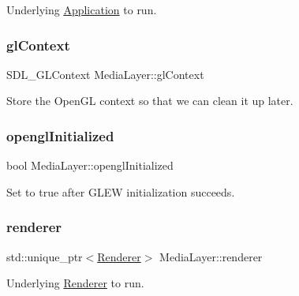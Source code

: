 Underlying \hyperlink{class_application}{Application} to run. 

\hypertarget{class_media_layer_a0e027d967e7c796efaed751e0b0a7090}{}\label{class_media_layer_a0e027d967e7c796efaed751e0b0a7090} 
\subsubsection{\texorpdfstring{gl\+Context}{glContext}}
{\footnotesize\ttfamily S\+D\+L\+\_\+\+G\+L\+Context Media\+Layer\+::gl\+Context\hspace{0.3cm}{\ttfamily [private]}}



Store the Open\+GL context so that we can clean it up later. 

\hypertarget{class_media_layer_abb67004f8dd82afd036233dfb225df3d}{}\label{class_media_layer_abb67004f8dd82afd036233dfb225df3d} 
\subsubsection{\texorpdfstring{opengl\+Initialized}{openglInitialized}}
{\footnotesize\ttfamily bool Media\+Layer\+::opengl\+Initialized\hspace{0.3cm}{\ttfamily [private]}}



Set to true after G\+L\+EW initialization succeeds. 

\hypertarget{class_media_layer_aee28804a7f4e1fb771b11e93b218e387}{}\label{class_media_layer_aee28804a7f4e1fb771b11e93b218e387} 
\subsubsection{\texorpdfstring{renderer}{renderer}}
{\footnotesize\ttfamily std\+::unique\+\_\+ptr$<$\hyperlink{class_renderer}{Renderer}$>$ Media\+Layer\+::renderer\hspace{0.3cm}{\ttfamily [private]}}



Underlying \hyperlink{class_renderer}{Renderer} to run. 

\hypertarget{class_media_layer_ab577253a72d7d158badb3932f09e7d3f}{}\label{class_media_layer_ab577253a72d7d158badb3932f09e7d3f} 
